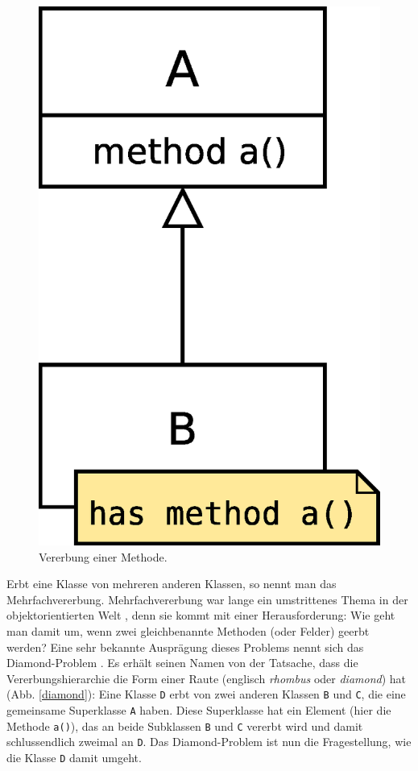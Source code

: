 \begin{figure}[h]
\centering
 \includegraphics[scale = 0.3]{pictures/inheritance}
 \caption{Vererbung einer Methode.}
 \label{inheritance}
\end{figure}

Erbt eine Klasse von mehreren anderen Klassen, so nennt man das Mehrfachvererbung. Mehrfachvererbung war lange ein umstrittenes Thema in der objektorientierten Welt \cite{mi1}\cite{mi2}, denn sie kommt mit einer Herausforderung: Wie geht man damit um, wenn zwei gleichbenannte Methoden (oder Felder) geerbt werden? Eine sehr bekannte Ausprägung dieses Problems nennt sich das Diamond-Problem \cite{dp}. Es erhält seinen Namen von der Tatsache, dass die Vererbungshierarchie die Form einer Raute (englisch \emph{rhombus} oder \emph{diamond}) hat (Abb. \ref{diamond}):
Eine Klasse \texttt{D} erbt von zwei anderen Klassen \texttt{B} und \texttt{C}, die eine gemeinsame Superklasse \texttt{A} haben. Diese Superklasse hat ein Element (hier die Methode \texttt{a()}), das an beide Subklassen \texttt{B} und \texttt{C} vererbt wird und damit schlussendlich zweimal an \texttt{D}. Das Diamond-Problem ist nun die Fragestellung, wie die Klasse \texttt{D} damit umgeht.

